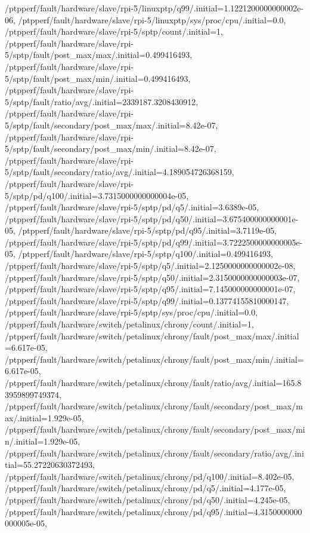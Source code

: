 {    /ptpperf/fault/hardware/slave/rpi-5/linuxptp/q99/.initial=1.1221200000000002e-06,
    /ptpperf/fault/hardware/slave/rpi-5/linuxptp/sys/proc/cpu/.initial=0.0,
    /ptpperf/fault/hardware/slave/rpi-5/sptp/count/.initial=1,
    /ptpperf/fault/hardware/slave/rpi-5/sptp/fault/post_max/max/.initial=0.499416493,
    /ptpperf/fault/hardware/slave/rpi-5/sptp/fault/post_max/min/.initial=0.499416493,
    /ptpperf/fault/hardware/slave/rpi-5/sptp/fault/ratio/avg/.initial=2339187.3208430912,
    /ptpperf/fault/hardware/slave/rpi-5/sptp/fault/secondary/post_max/max/.initial=8.42e-07,
    /ptpperf/fault/hardware/slave/rpi-5/sptp/fault/secondary/post_max/min/.initial=8.42e-07,
    /ptpperf/fault/hardware/slave/rpi-5/sptp/fault/secondary/ratio/avg/.initial=4.189054726368159,
    /ptpperf/fault/hardware/slave/rpi-5/sptp/pd/q100/.initial=3.7315000000000004e-05,
    /ptpperf/fault/hardware/slave/rpi-5/sptp/pd/q5/.initial=3.6389e-05,
    /ptpperf/fault/hardware/slave/rpi-5/sptp/pd/q50/.initial=3.675400000000001e-05,
    /ptpperf/fault/hardware/slave/rpi-5/sptp/pd/q95/.initial=3.7119e-05,
    /ptpperf/fault/hardware/slave/rpi-5/sptp/pd/q99/.initial=3.7222500000000005e-05,
    /ptpperf/fault/hardware/slave/rpi-5/sptp/q100/.initial=0.499416493,
    /ptpperf/fault/hardware/slave/rpi-5/sptp/q5/.initial=2.1250000000000002e-08,
    /ptpperf/fault/hardware/slave/rpi-5/sptp/q50/.initial=2.3150000000000003e-07,
    /ptpperf/fault/hardware/slave/rpi-5/sptp/q95/.initial=7.145000000000001e-07,
    /ptpperf/fault/hardware/slave/rpi-5/sptp/q99/.initial=0.13774155810000147,
    /ptpperf/fault/hardware/slave/rpi-5/sptp/sys/proc/cpu/.initial=0.0,
    /ptpperf/fault/hardware/switch/petalinux/chrony/count/.initial=1,
    /ptpperf/fault/hardware/switch/petalinux/chrony/fault/post_max/max/.initial=6.617e-05,
    /ptpperf/fault/hardware/switch/petalinux/chrony/fault/post_max/min/.initial=6.617e-05,
    /ptpperf/fault/hardware/switch/petalinux/chrony/fault/ratio/avg/.initial=165.83959899749374,
    /ptpperf/fault/hardware/switch/petalinux/chrony/fault/secondary/post_max/max/.initial=1.929e-05,
    /ptpperf/fault/hardware/switch/petalinux/chrony/fault/secondary/post_max/min/.initial=1.929e-05,
    /ptpperf/fault/hardware/switch/petalinux/chrony/fault/secondary/ratio/avg/.initial=55.27220630372493,
    /ptpperf/fault/hardware/switch/petalinux/chrony/pd/q100/.initial=8.402e-05,
    /ptpperf/fault/hardware/switch/petalinux/chrony/pd/q5/.initial=4.177e-05,
    /ptpperf/fault/hardware/switch/petalinux/chrony/pd/q50/.initial=4.245e-05,
    /ptpperf/fault/hardware/switch/petalinux/chrony/pd/q95/.initial=4.3150000000000005e-05,
}
